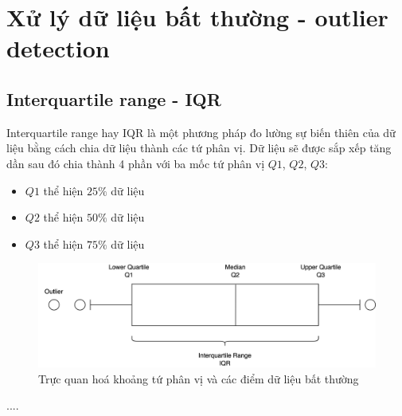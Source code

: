 \section{Xử lý dữ liệu bất thường - outlier detection}
\subsection{Interquartile range - IQR}
Interquartile range hay IQR là một phương pháp đo lường sự biến thiên của dữ liệu bằng cách chia dữ liệu thành các tứ phân vị. Dữ liệu sẽ được sắp xếp tăng dần sau đó chia thành 4 phần với ba mốc tứ phân vị $Q1$, $Q2$, $Q3$:
\begin{itemize}
    \item $Q1$ thể hiện $25\%$ dữ liệu
    \item $Q2$ thể hiện $50\%$ dữ liệu
    \item $Q3$ thể hiện $75\%$ dữ liệu
\end{itemize}
\begin{figure}[h]
    \centering
\includegraphics[width=\textwidth]{image/section3_2/iqr.drawio.png}
    \caption{Trực quan hoá khoảng tứ phân vị và các điểm dữ liệu bất thường}
    \label{fig:section3_2_iqr}
\end{figure}

....